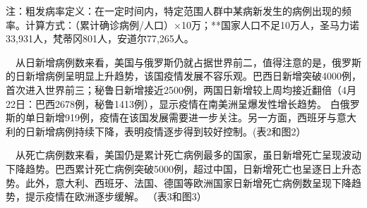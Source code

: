 \documentclass[]{article}
\begin{document}
\begin{table}[H]
    \begin{tablenotes}
        \fontsize{12}{12}
        \selectfont
        \item 注：粗发病率定义：在一定时间内，特定范围人群中某病新发生的病例出现的频率。计算方式：（累计确诊病例/人口）×10万；**国家人口不足10万人，圣马力诺33,931人，梵蒂冈801人，安道尔77,265人。  %
      \end{tablenotes}
\end{table}

\newpage

\(\quad\)从日新增病例数来看，美国与俄罗斯仍就占据世界前二，值得注意的是，俄罗斯的日新增病例呈明显上升趋势，该国疫情发展不容乐观。巴西日新增突破4000例，首次进入世界前三；秘鲁日新增接近2500例，两国日新增较上周均接近翻倍（4月22日：巴西2678例，秘鲁1413例），显示疫情在南美洲呈爆发性增长趋势。
白俄罗斯的单日新增919例，疫情在该国发展需要进一步关注。另一方面，西班牙与意大利的日新增病例持续下降，表明疫情逐步得到较好控制。(表2和图2）

\(\quad\)从死亡病例数来看，美国仍是累计死亡病例最多的国家，虽日新增死亡呈现波动下降趋势。巴西累计死亡病例突破5000例，超过中国，日新增死亡也呈逐日上升态势。此外，意大利、西班牙、法国、德国等欧洲国家日新增死亡病例数呈现下降趋势，提示疫情在欧洲逐步缓解。
（表3和图3）
\end{document}

